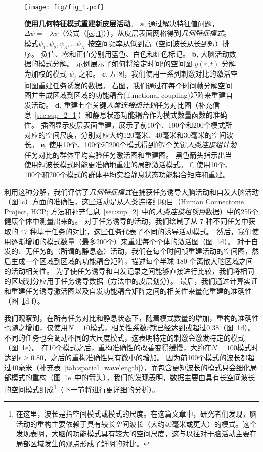 \documentclass[lang=cn,a4paper,newtx,citestyle=gb7714-2015, bibstyle=gb7714-2015]{elegantpaper}
\begin{document}
\begin{figure}[!htb]
	\centering
	\texttt{[image: fig/fig\_1.pdf]}
	\caption{\textbf{使用几何特征模式重建新皮层活动}。
	\textbf{a}, 通过解决特征值问题，$ \Delta \psi = -\lambda \psi $（公式（\ref{eq:1}）），从皮层表面网格得到\textit{几何特征模式}。
	模式$ \psi_1, \psi_2, \psi_3, ... \psi_N $ 按空间频率从低到高（空间波长从长到短）排序。
	负值、零和正值分别用蓝色、白色和红色标记。
	\textbf{b}, 大脑活动数据的模式分解。
	示例展示了如何将给定时间$ t $的空间图 $ y(r,t) $ 分解为加权的模式 $ \psi_j $ 之和。
	\textbf{c}, 左图，我们使用一系列刺激对比的激活空间图重建任务诱发的数据。
	右图，我们通过在每个时间帧分解空间图并生成区域到区域的功能耦合(,functional coupling)矩阵来重建自发活动。
	\textbf{d}, 重建七个关键\textit{人类连接组计划}任务对比图（补充信息~\ref{sec:sup_2_1}）和静息状态功能耦合作为模式数量函数的准确性。
	插图显示皮层表面重建，展示了前10个、100个和200个模式所对应的空间尺度，分别对应大约120毫米、40毫米和30毫米的空间波长。
	 \textbf{e}, 使用10个、100个和200个模式得到的7个关键\textit{人类连接组计划}任务对比的群体平均实验任务激活图和重建图。 %
	 黑色箭头指示出当使用短波长模式时能更准确地重建的局部激活模式。 
	 \textbf{f}, 使用10个、100个和200个模式的群体平均实验静息状态功能耦合矩阵和重建。
	} \label{fig:1}
\end{figure}


利用这种分解，我们评估了\textit{几何特征模式}在捕获任务诱导大脑活动和自发大脑活动（图\ref{fig:1}c）方面的准确性，这些活动是从人类连接组项目（Human Connectome Project, HCP; 方法和补充信息~\ref{sec:sup_2}~中的\textit{人类连接组项目}数据）中的255个健康个体中测量出来的。
对于任务诱导的活动，我们绘制了从 7 种不同任务中获取的 47 种基于任务的对比，这些任务代表了不同的诱导活动模式。
然后，我们使用逐渐增加的模式数量（最多200个）来重建每个个体的激活图（图~\ref{fig:1}d）。
对于自发的、无任务的（所谓的静息态）活动，我们在每个时间帧重建活动的空间图，然后生成一个区域到区域的功能耦合矩阵，描述每个半球 180 个离散大脑区域之间的活动相关性。
为了使任务诱导和自发记录之间能够直接进行比较，我们将相同的区域划分应用于任务诱导数据（方法中的皮层划分）。
最后，我们通过计算实证和重建任务诱导激活图以及自发功能耦合矩阵之间的相关性来量化重建的准确性（图~\ref{fig:1}d-f）。


我们观察到，在所有任务对比和静息状态下，随着模式数量的增加，重构的准确性也随之增加，仅使用$ N=10 $模式，相关性系数$ r $就已经达到或超过0.38（图~\ref{fig:1}d）。
不同的任务也会调动不同的大尺度模式，这表明特定的刺激会激发特定的模式（图~\ref{fig:1}e）。
在10个模式之后，重构准确性的改善变得缓慢，大约在$ N=100 $模式时达到$ r \geq 0.80 $，之后的重构准确性只有微小的增加。
因为前100个模式的波长都超过40毫米（补充表~\ref{tab:spatial_wavelength}），而包含更短波长的模式只会细化局部模式的重构（图~\ref{fig:1}e~中的箭头），我们的发现表明，数据主要由具有长空间波长的空间模式组成\footnote{在这里，波长是指空间模式或模式的尺度。在这篇文章中，研究者们发现，脑活动的重构主要依赖于具有较长空间波长（大约40毫米或更大）的模式。这个发现表明，大脑的功能模式具有较大的空间尺度，这与以往对于脑活动主要在局部区域发生的观点形成了鲜明的对比。}（下一节将进行更详细的分析）。
\end{document}
